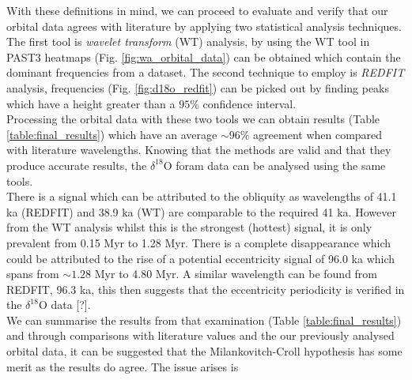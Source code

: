 \documentclass[12pt, onecolumn]{revtex4}    %
\begin{document}
With these definitions in mind, we can proceed to evaluate and verify that our orbital data agrees with literature by applying two statistical analysis techniques. The first tool is \textit{wavelet transform} (WT) analysis, by using the WT tool in PAST3 \cite{past3} heatmaps (Fig. \ref{fig:wa_orbital_data}) can be obtained which contain the dominant frequencies from a dataset. The second technique to employ is \textit{REDFIT} analysis, frequencies (Fig. \ref{fig:d18o_redfit}) can be picked out by finding peaks which have a height greater than a $95\%$ confidence interval. \\

Processing the orbital data with these two tools we can obtain results (Table \ref{table:final_results}) which have an average $\sim 96 \%$ agreement when compared with literature wavelengths. Knowing that the methods are valid and that they produce accurate results, the $\delta^{18}$O foram data can be analysed using the same tools. \\

There is a signal which can be attributed to the obliquity as wavelengths of 41.1 ka (REDFIT) and 38.9 ka (WT) are comparable to the required 41 ka. However from the WT analysis whilst this is the strongest (hottest) signal, it is only prevalent from 0.15 Myr to 1.28 Myr. There is a complete disappearance which could be attributed to the rise of a potential eccentricity signal of 96.0 ka which spans from $\sim 1.28$ Myr to 4.80 Myr. A similar wavelength can be found from REDFIT, 96.3 ka, this then suggests that the eccentricity periodicity is verified in the $\delta^{18}$O data [?]. \\

We can summarise the results from that examination (Table \ref{table:final_results}) and through comparisons with literature values and the our previously analysed orbital data, it can be suggested that the Milankovitch-Croll hypothesis has some merit as the results do agree. The issue arises is 

\newpage





\newpage
\end{document}
